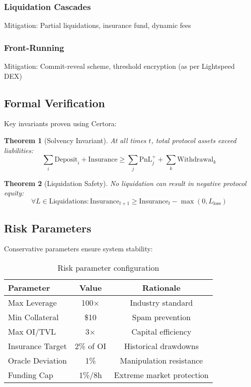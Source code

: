 \documentclass[11pt,a4paper]{article}
\newtheorem{theorem}{Theorem}[section]
\begin{document}
\subsubsection{Liquidation Cascades}
Mitigation: Partial liquidations, insurance fund, dynamic fees

\subsubsection{Front-Running}
Mitigation: Commit-reveal scheme, threshold encryption (as per Lightspeed DEX)

\subsection{Formal Verification}

Key invariants proven using Certora:

\begin{theorem}[Solvency Invariant]
At all times $t$, total protocol assets exceed liabilities:
\begin{equation}
\sum_{i} \text{Deposit}_i + \text{Insurance} \geq \sum_{j} \text{PnL}_j^+ + \sum_{k} \text{Withdrawal}_k
\end{equation}
\end{theorem}

\begin{theorem}[Liquidation Safety]
No liquidation can result in negative protocol equity:
\begin{equation}
\forall L \in \text{Liquidations}: \text{Insurance}_{t+1} \geq \text{Insurance}_t - \max(0, L_{\text{loss}})
\end{equation}
\end{theorem}

\subsection{Risk Parameters}

Conservative parameters ensure system stability:

\begin{table}[h]
\centering
\begin{tabular}{|l|c|c|}
\hline
\textbf{Parameter} & \textbf{Value} & \textbf{Rationale} \\
\hline
Max Leverage & 100× & Industry standard \\
Min Collateral & \$10 & Spam prevention \\
Max OI/TVL & 3× & Capital efficiency \\
Insurance Target & 2\% of OI & Historical drawdowns \\
Oracle Deviation & 1\% & Manipulation resistance \\
Funding Cap & 1\%/8h & Extreme market protection \\
\hline
\end{tabular}
\caption{Risk parameter configuration}
\end{table}
\end{document}
